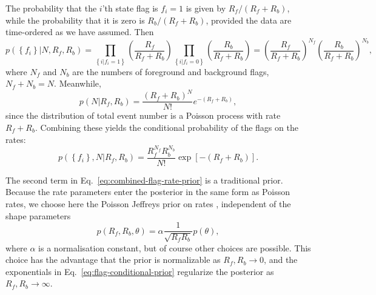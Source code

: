 \documentclass[aps,prd]{revtex4-1}
\newcommand{\mathset}[1]{\left\{ #1 \right\}}
\begin{document}
The probability that the $i$'th state flag is $f_i=1$ is given by $R_f/(R_f+R_b)$, while the probability that it is zero is $R_b/(R_f+R_b)$, provided the data are time-ordered as we have assumed.  Then
\begin{equation}
p\left( \mathset{f_i} | N, R_f, R_b\right) = 
\prod_{\mathset{i|f_i=1}} \left(\frac{R_f}{R_f+R_b}\right) 
\prod_{\mathset{i|f_i=0}} \left(\frac{R_b}{R_f+R_b}\right) =
\left(\frac{R_f}{R_f+R_b}\right)^{N_f} \left(\frac{R_b}{R_f+R_b}\right)^{N_b},
\end{equation}
where $N_f$ and $N_b$ are the numbers of foreground and background flags, $N_f+N_b=N$.
Meanwhile,
\begin{equation}
p\left(N |R_f, R_b\right) = \frac{\left(R_f+R_b\right)^N}{N!} e^{-(R_f+R_b)},
\end{equation}
since the distribution of total event number is a Poisson process
with rate $R_f+R_b$.  Combining these yields the conditional probability of the flags on the rates:
\begin{equation}
  \label{eq:flag-conditional-prior}
  p\left(\mathset{f_i},N | R_f, R_b\right) = \frac{R_f^{N_f}
    R_b^{N_b}}{N!} \exp\left[ - \left(R_f + R_b\right) \right].
\end{equation} 


The second term in Eq.~\eqref{eq:combined-flag-rate-prior} is a
traditional prior.  Because the rate parameters enter the posterior in
the same form as Poisson rates, we choose here the Poisson Jeffreys
prior on rates \citep{Jeffreys1946}, independent of the shape
parameters
\begin{equation}
  p\left( R_f, R_b, \theta\right) = \alpha \frac{1}{\sqrt{R_f R_b}} p(\theta),
\end{equation}
where $\alpha$ is a normalisation constant, but of course other choices are possible.  This choice has the advantage that the prior is normalizable as $R_f, R_b \to 0$, and the
exponentials in Eq.~\eqref{eq:flag-conditional-prior} regularize the
posterior as $R_f, R_b \to \infty$.
\end{document}

